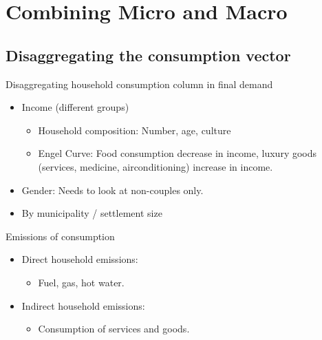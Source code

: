 \section{Combining Micro and Macro} %
\begin{multicols}{2}
\subsection{Disaggregating the consumption vector}
Disaggregating household consumption column in final demand
 \begin{itemize}
  \item Income (different groups)
        \begin{itemize}
         \item Household composition: Number, age, culture
         \item Engel Curve: Food consumption decrease in income, luxury goods (services, medicine, airconditioning) increase in income.
        \end{itemize}
  \item Gender: Needs to look at non-couples only.
  \item By municipality / settlement size
 \end{itemize}
 Emissions of consumption
 \begin{itemize}
  \item Direct household emissions:
  \begin{itemize}
    \item Fuel, gas, hot water.
  \end{itemize}
  \item Indirect household emissions:
  \begin{itemize}
    \item Consumption of services and goods.
  \end{itemize}
 \end{itemize}


\end{multicols}
